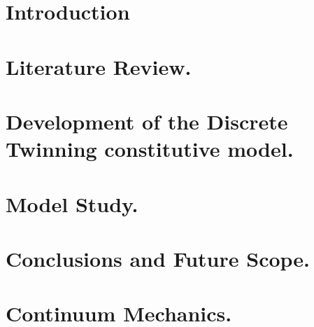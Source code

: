 \documentclass{report}
\begin{document}




\tableofcontents


\listoffigures
{}

\listoftables
{}



\chapter{Introduction}


\chapter{Literature Review.}


\chapter{Development of the Discrete Twinning constitutive model.}


\chapter{Model Study.}



\chapter{Conclusions and Future Scope.}


\appendix
\chapter{Continuum Mechanics.}
\label{Appendix:Continuum_mechanics}

\end{document}
